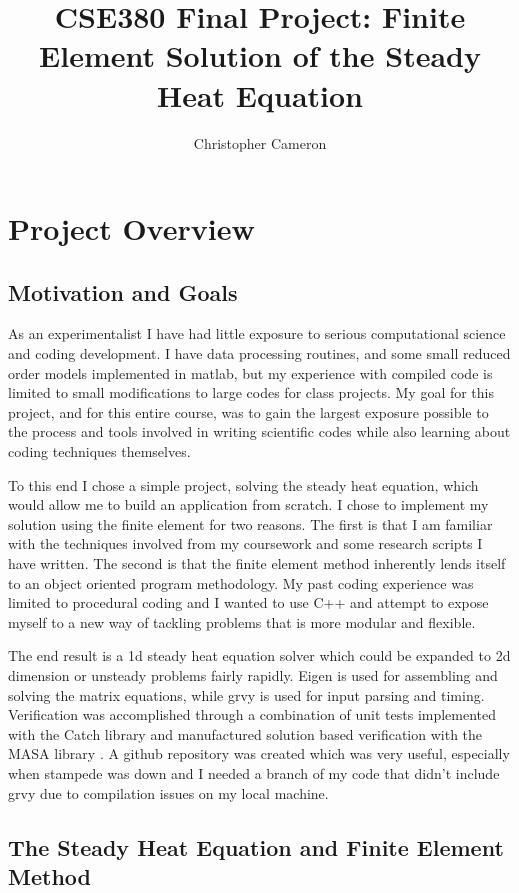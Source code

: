 \documentclass[12pt]{article}
\title{CSE380 Final Project: Finite Element Solution of the Steady Heat Equation}
\author{Christopher Cameron}
\date{} %
\begin{document}
\maketitle

\section*{Project Overview}
\subsection*{Motivation and Goals}

As an experimentalist I have had little exposure to serious computational science and coding development.  I have data processing routines, and some small reduced order models implemented in matlab, but my experience with compiled code is limited to small modifications to large codes for class projects.  My goal for this project, and for this entire course, was to gain the largest exposure possible to the process and tools involved in writing scientific codes while also learning about coding techniques themselves.

To this end I chose a simple project, solving the steady heat equation, which would allow me to build an application from scratch.  I chose to implement my solution using the finite element for two reasons.  The first is that I am familiar with the techniques involved from my coursework and some research scripts I have written.  The second is that the finite element method inherently lends itself to an object oriented program methodology.  My past coding experience was limited to procedural coding and I wanted to use C++ and attempt to expose myself to a new way of tackling problems that is more modular and flexible.

The end result is a 1d steady heat equation solver which could be expanded to 2d dimension or unsteady problems fairly rapidly.  Eigen is used for assembling and solving the matrix equations, while grvy is used for input parsing and timing.  Verification was accomplished through a combination of unit tests implemented with the Catch library and manufactured solution based verification with the MASA library \cite{MASA}.  A github repository was created which was very useful, especially when stampede was down and I needed a branch of my code that didn't include grvy due to compilation issues on my local machine.

\subsection*{The Steady Heat Equation and Finite Element Method}
\end{document}
